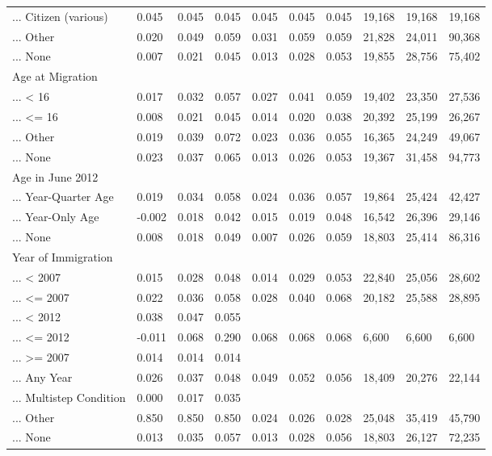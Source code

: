 \documentclass[
  letterpaper,
  DIV=11,
  numbers=noendperiod]{scrartcl}
\begin{document}
\begin{table}[!htbp]
{\begin{tabular}{llllllllll}
... Citizen (various) & 0.045 & 0.045 & 0.045 & 0.045 & 0.045 & 0.045 & 19,168 & 19,168 & 19,168 \\ 
... Other & 0.020 & 0.049 & 0.059 & 0.031 & 0.059 & 0.059 & 21,828 & 24,011 & 90,368 \\ 
... None & 0.007 & 0.021 & 0.045 & 0.013 & 0.028 & 0.053 & 19,855 & 28,756 & 75,402 \\ 
Age at Migration &  &  &  &  &  &  &  &  &  \\ 
... < 16 & 0.017 & 0.032 & 0.057 & 0.027 & 0.041 & 0.059 & 19,402 & 23,350 & 27,536 \\ 
... <= 16 & 0.008 & 0.021 & 0.045 & 0.014 & 0.020 & 0.038 & 20,392 & 25,199 & 26,267 \\ 
... Other & 0.019 & 0.039 & 0.072 & 0.023 & 0.036 & 0.055 & 16,365 & 24,249 & 49,067 \\ 
... None & 0.023 & 0.037 & 0.065 & 0.013 & 0.026 & 0.053 & 19,367 & 31,458 & 94,773 \\ 
Age in June 2012 &  &  &  &  &  &  &  &  &  \\ 
... Year-Quarter Age & 0.019 & 0.034 & 0.058 & 0.024 & 0.036 & 0.057 & 19,864 & 25,424 & 42,427 \\ 
... Year-Only Age & -0.002 & 0.018 & 0.042 & 0.015 & 0.019 & 0.048 & 16,542 & 26,396 & 29,146 \\ 
... None & 0.008 & 0.018 & 0.049 & 0.007 & 0.026 & 0.059 & 18,803 & 25,414 & 86,316 \\ 
Year of Immigration &  &  &  &  &  &  &  &  &  \\ 
... < 2007 & 0.015 & 0.028 & 0.048 & 0.014 & 0.029 & 0.053 & 22,840 & 25,056 & 28,602 \\ 
... <= 2007 & 0.022 & 0.036 & 0.058 & 0.028 & 0.040 & 0.068 & 20,182 & 25,588 & 28,895 \\ 
... < 2012 & 0.038 & 0.047 & 0.055 &  &  &  &  &  &  \\ 
... <= 2012 & -0.011 & 0.068 & 0.290 & 0.068 & 0.068 & 0.068 & 6,600 & 6,600 & 6,600 \\ 
... >= 2007 & 0.014 & 0.014 & 0.014 &  &  &  &  &  &  \\ 
... Any Year & 0.026 & 0.037 & 0.048 & 0.049 & 0.052 & 0.056 & 18,409 & 20,276 & 22,144 \\ 
... Multistep Condition & 0.000 & 0.017 & 0.035 &  &  &  &  &  &  \\ 
... Other & 0.850 & 0.850 & 0.850 & 0.024 & 0.026 & 0.028 & 25,048 & 35,419 & 45,790 \\ 
... None & 0.013 & 0.035 & 0.057 & 0.013 & 0.028 & 0.056 & 18,803 & 26,127 & 72,235 \\ 

\end{tabular}}
\end{table}
\end{document}
